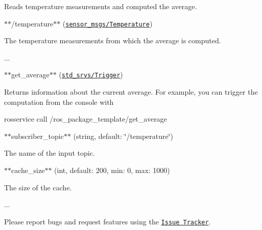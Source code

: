 Reads temperature measurements and computed the average.


\begin{DoxyItemize}
\item $\ast$$\ast${\ttfamily /temperature}$\ast$$\ast$ (\href{http://docs.ros.org/api/sensor_msgs/html/msg/Temperature.html}{\tt sensor\+\_\+msgs/\+Temperature})

The temperature measurements from which the average is computed.
\end{DoxyItemize}

...


\begin{DoxyItemize}
\item $\ast$$\ast${\ttfamily get\+\_\+average}$\ast$$\ast$ (\href{http://docs.ros.org/api/std_srvs/html/srv/Trigger.html}{\tt std\+\_\+srvs/\+Trigger})

Returns information about the current average. For example, you can trigger the computation from the console with \begin{DoxyVerb}rosservice call /ros_package_template/get_average
\end{DoxyVerb}

\end{DoxyItemize}


\begin{DoxyItemize}
\item $\ast$$\ast${\ttfamily subscriber\+\_\+topic}$\ast$$\ast$ (string, default\+: \char`\"{}/temperature\char`\"{})

The name of the input topic.
\item $\ast$$\ast${\ttfamily cache\+\_\+size}$\ast$$\ast$ (int, default\+: 200, min\+: 0, max\+: 1000)

The size of the cache.
\end{DoxyItemize}

...

Please report bugs and request features using the \href{https://github.com/ethz-asl/ros_best_practices/issues}{\tt Issue Tracker}. 